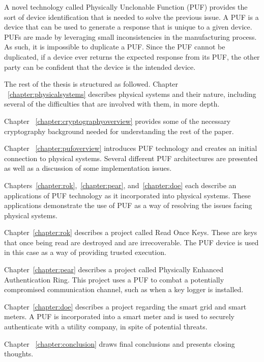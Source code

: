 A novel technology called Physically Unclonable Function (PUF) provides the sort of device identification that is needed
to solve the previous issue. A PUF is a device that can be used to generate a response that is unique to a given device.
PUFs are made by leveraging small inconsistencies in the manufacturing process. As such, it is impossible to
duplicate a PUF. Since the PUF cannot be duplicated, if a device ever returns the expected response from its PUF,
the other party can be confident that the device is the intended device.

The rest of the thesis is structured as followed. 
Chapter ~\ref{chapter:physicalsystems} describes physical systems and their nature, including several of the difficulties that are involved with them, in more depth. 

Chapter ~\ref{chapter:cryptographyoverview} provides some of the necessary cryptography background needed for
understanding the rest of the paper.

Chapter ~\ref{chapter:pufoverview} introduces PUF technology and creates an initial connection to physical systems. 
Several different PUF architectures are presented as well as a discussion of some implementation issues.

Chapters~\ref{chapter:rok},~\ref{chapter:pear}, and~\ref{chapter:doe} each describe an applications of PUF 
technology as it incorporated into physical systems. These applications demonstrate the use of PUF as a way of 
resolving the issues facing physical systems. 

Chapter~\ref{chapter:rok} describes a project called Read Once Keys. These are keys that once being read are
destroyed and are irrecoverable. The PUF device is used in this case as a way of providing trusted execution.

Chapter~\ref{chapter:pear} describes a project called Physically Enhanced Authentication Ring. This project uses
a PUF to combat a potentially compromised communication channel, such as when a key logger is installed.

Chapter~\ref{chapter:doe} describes a project regarding the smart grid and smart meters. A PUF is incorporated
into a smart meter and is used to securely authenticate with a utility company, in spite of potential threats.

Chapter ~\ref{chapter:conclusion} draws final conclusions and presents closing thoughts.
